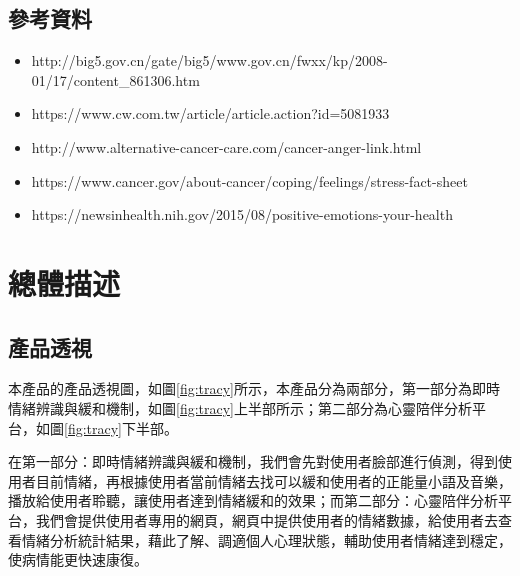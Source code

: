 \documentclass[12pt]{scrreprt}
\begin{document}
\section{參考資料}
\begin{itemize}
\item{http://big5.gov.cn/gate/big5/www.gov.cn/fwxx/kp/2008-01/17/content_861306.htm}

\item{https://www.cw.com.tw/article/article.action?id=5081933}

\item{http://www.alternative-cancer-care.com/cancer-anger-link.html}

\item{https://www.cancer.gov/about-cancer/coping/feelings/stress-fact-sheet}

\item{https://newsinhealth.nih.gov/2015/08/positive-emotions-your-health}
\end{itemize}


\chapter{總體描述}

\section{產品透視} %

本產品的產品透視圖，如圖\ref{fig:tracy}所示，本產品分為兩部分，第一部分為即時情緒辨識與緩和機制，如圖\ref{fig:tracy}上半部所示；第二部分為心靈陪伴分析平台，如圖\ref{fig:tracy}下半部。

在第一部分：即時情緒辨識與緩和機制，我們會先對使用者臉部進行偵測，得到使用者目前情緒，再根據使用者當前情緒去找可以緩和使用者的正能量小語及音樂，播放給使用者聆聽，讓使用者達到情緒緩和的效果；而第二部分：心靈陪伴分析平台，我們會提供使用者專用的網頁，網頁中提供使用者的情緒數據，給使用者去查看情緒分析統計結果，藉此了解、調適個人心理狀態，輔助使用者情緒達到穩定，使病情能更快速康復。
\end{document}
